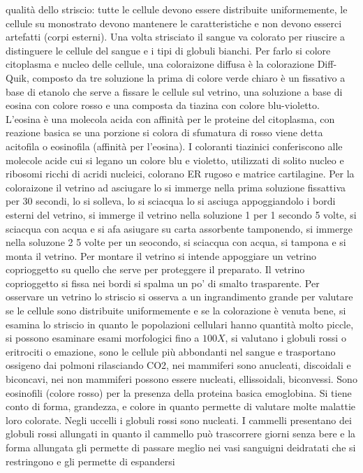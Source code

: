 qualit\`a dello striscio: tutte le cellule devono essere distribuite uniformemente, le cellule su monostrato devono mantenere le caratteristiche e non devono esserci artefatti (corpi 
esterni). Una volta strisciato il sangue va colorato per riuscire a distinguere le cellule del sangue e i tipi di globuli bianchi. Per farlo si colore citoplasma e nucleo delle cellule, 
una coloraizone diffusa \`e la colorazione Diff-Quik, composto da tre soluzione la  prima di colore verde chiaro \`e un fissativo a base di etanolo che serve a fissare le cellule sul 
vetrino, una soluzione a base di eosina con colore rosso e una composta da tiazina con colore blu-violetto. L'eosina \`e una molecola acida con affinit\`a per le proteine del citoplasma, 
con reazione basica se una porzione si colora di sfumatura di rosso viene detta acitofila o eosinofila (affinit\`a per l'eosina). I coloranti tiazinici conferiscono alle molecole acide
cui si legano un colore blu e violetto, utilizzati di solito nucleo e ribosomi ricchi di acridi nucleici, colorano ER rugoso e matrice cartilagine. Per la coloraizone il vetrino ad
asciugare lo si immerge nella prima soluzione fissattiva per $30$ secondi, lo si solleva, lo si sciacqua lo si asciuga appoggiandolo i bordi esterni del vetrino, si immerge il vetrino
nella soluzione 1 per 1 secondo 5 volte, si sciacqua con acqua e si afa asiugare su carta assorbente tamponendo, si immerge nella soluzone 2 5 volte per un seocondo, si sciacqua con 
acqua, si tampona e si monta il vetrino. Per montare il vetrino si intende appoggiare un vetrino coprioggetto su quello che serve per proteggere il preparato. Il vetrino coprioggetto si 
fissa nei bordi si spalma un po' di smalto trasparente. Per osservare un vetrino lo striscio si osserva a un ingrandimento grande per valutare se le cellule sono distribuite uniformemente
e se la colorazione \`e venuta bene, si esamina lo striscio in quanto le popolazioni cellulari hanno quantit\`a molto piccle, si possono esaminare esami morfologici fino a $100X$, si 
valutano i globuli rossi o eritrociti o emazione, sono le cellule pi\`u abbondanti nel sangue e trasportano ossigeno dai polmoni rilasciando CO2, nei mammiferi sono anucleati, discoidali 
e biconcavi, nei non mammiferi possono essere nucleati, ellissoidali, biconvessi. Sono eosinofili (colore rosso) per la presenza della proteina basica emoglobina. Si tiene conto di 
forma, grandezza, e colore in quanto permette di valutare molte malattie loro colorate. Negli uccelli i globuli rossi sono nucleati. I cammelli presentano dei globuli rossi allungati in
quanto il cammello pu\`o trascorrere giorni senza bere e la forma allungata gli permette di passare meglio nei vasi sanguigni deidratati che si restringono e gli permette di espandersi
